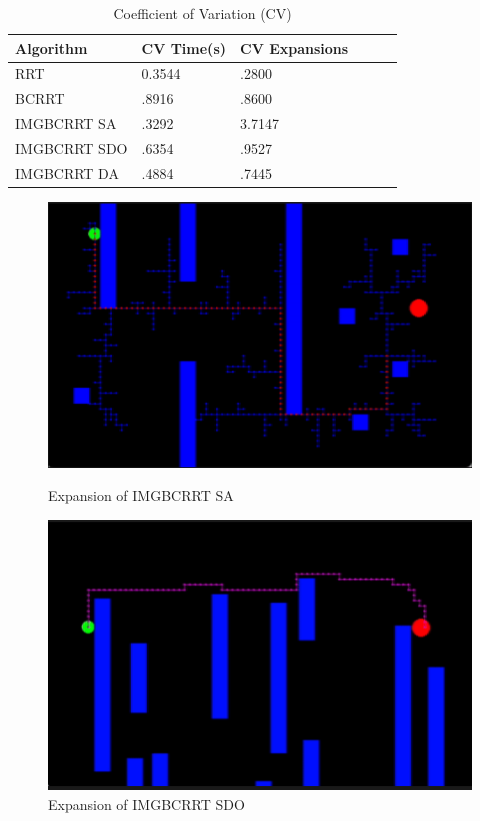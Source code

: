 \documentclass{article}
\begin{document}
\begin{table}[h]
  \caption{Coefficient of Variation (CV)}
  \label{CV}
  \centering
  \begin{tabular}{llllll}
    \cmidrule(r){1-3}
   Algorithm  & CV Time(s) &  CV Expansions\\
    \midrule
    RRT & 0.3544 & .2800\\
    BCRRT & .8916 & .8600\\
    IMGBCRRT SA & .3292 & 3.7147\\
     IMGBCRRT SDO & .6354 & .9527\\
     IMGBCRRT DA  & .4884 & .7445\\
    \bottomrule
  \end{tabular}
\end{table}



\begin{figure}[h]
	\centering
\begin{minipage}{.5\textwidth}
	\includegraphics[scale=0.45]{IMGSA.png}
        \caption{Expansion of IMGBCRRT SA}
\end{minipage}%
\begin{minipage}{.5\textwidth}
\centering
	\includegraphics[scale=0.50]{IMGSDO.png}
        \caption{Expansion of IMGBCRRT SDO}
\end{minipage}

\end{figure}
\end{document}
